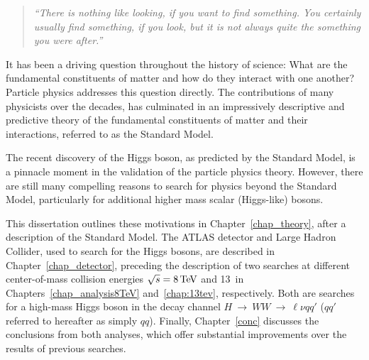 \begin{quote}
\raggedright{\emph{``There is nothing like looking, if you want to find something. You certainly usually find something, if you look, but it is not always quite the something you were after.''}} \\
\end{quote}
It has been a driving question throughout the history of science: What are the fundamental constituents of matter and how do they interact with one another? Particle physics addresses this question directly. The contributions of many physicists over the decades, has culminated in an impressively descriptive and predictive theory of the fundamental constituents of matter and their interactions, referred to as the Standard Model. 

The recent discovery of the Higgs boson, as predicted by the Standard Model, is a pinnacle moment in the validation of the particle physics theory. However, there are still many compelling reasons to search for physics beyond the Standard Model, particularly for additional higher mass scalar (Higgs-like) bosons. 

This dissertation outlines these motivations in Chapter~\ref{chap_theory}, after a description of the Standard Model. The ATLAS detector and Large Hadron Collider, used to search for the Higgs bosons, are described in Chapter~\ref{chap_detector}, preceding the description of two searches at different center-of-mass collision energies $\sqrt{s} = 8\mathrm{\,Te\kern -0.1em V}$ and 13\TeV\ in Chapters~\ref{chap_analysis8TeV} and~\ref{chap:13tev}, respectively. Both are searches for a high-mass Higgs boson in the decay channel $H~{\rightarrow}~WW~{\rightarrow}~\ell\nu{qq'}$ ($qq'$ referred to hereafter as simply $qq$). Finally, Chapter~\ref{conc} discusses the conclusions from both analyses, which offer substantial improvements over the results of previous searches. 